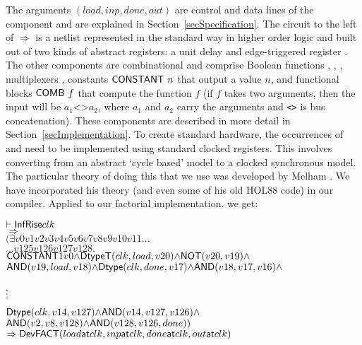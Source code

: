 \documentclass{llncs}
\begin{document}
The arguments $(load,inp,done,out)$ are control and data lines of the
component and are explained in Section~\ref{secSpecification}. The
circuit to the left of $\Rightarrow$ is a netlist represented in the
standard way in higher order logic \cite{Mel93} and built out of two
kinds of abstract registers: a unit delay  and edge-triggered
register . The other components are combinational and
comprise Boolean functions ,
, , multiplexers , constants $\mathsf{CONSTANT}~n$ that output a value $n$,
and functional blocks
$\mathsf{COMB}~f$ that compute the function $f$ (if $f$ takes two arguments,
then the input will be $a_1\texttt{<>}a_2$, where $a_1$ and $a_2$ carry the arguments
and \texttt{<>} is bus concatenation). These components are
described in more detail in Section~\ref{secImplementation}. To
create standard hardware, the occurrences of
 and  need to be implemented using standard
clocked registers. This involves converting from an abstract `cycle
based' model to a clocked synchronous model. The particular theory of
doing this that we use was developed by Melham \cite{Mel93}. We have
incorporated his theory (and even some of his old HOL88 code) in
our compiler. Applied to our factorial implementation.
we get:

\vspace*{-1.5mm}

{\baselineskip10pt\begin{alltt}
\( \vdash \DEF{InfRise} clk                                                                        \)
\(   \Rightarrow                                                                                   \)
\(   ({\exists}v0 v1 v2 v3 v4 v5 v6 v7 v8 v9 v10 v11 ...                               \)
\(     ... v125 v126 v127 v128.                                                                   \)
\(     \DEF{CONSTANT} 1 v0 {\wedge} \DEF{DtypeT}(clk,load,v20) {\wedge} \DEF{NOT}(v20,v19) {\wedge}        \)
\(     \DEF{AND}(v19,load,v18) {\wedge} \DEF{Dtype}(clk,done,v17) {\wedge} \DEF{AND}(v18,v17,v16) {\wedge} \)

       \(\raisebox{3mm}{\vdots}\)
\(     \DEF{Dtype}(clk,v14,v127) {\wedge} \DEF{AND}(v14,v127,v126) {\wedge}  \)
\(     \DEF{AND} (v2,v8,v128) {\wedge} \DEF{AND}(v128,v126,done))               \)
\(   \Rightarrow \DEF{Dev} \DEF{FACT} (load \DEF{at} clk, inp \DEF{at} clk, done \DEF{at} clk, out \DEF{at} clk) \)
\end{alltt}}

\vspace*{-2.5mm}
\end{document}
